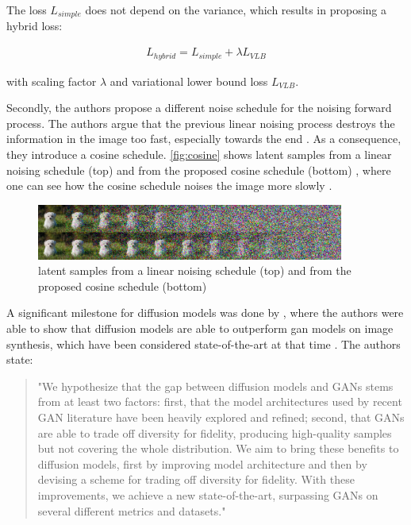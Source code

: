 The loss $L_{simple}$ does not depend on the variance, which results in \cite{nichol2021ImprovedDenoisingDiffusion} proposing a hybrid loss:

\begin{equation}
    \label{eqn:l_hybrid}
    \begin{align*}
        L_{hybrid} =L_{simple}+\lambda L_{VLB}
    \end{align*}
\end{equation}

with scaling factor $\lambda$ and variational lower bound loss $L_{VLB}$.

Secondly, the authors propose a different noise schedule for the noising forward process.
The authors argue that the previous linear noising process destroys the information in the image too fast, especially towards the end \cite{nichol2021ImprovedDenoisingDiffusion}.
As a consequence, they introduce a cosine schedule.
\autoref{fig:cosine} shows latent samples from a linear noising schedule (top) and from the proposed cosine schedule (bottom) \cite[Figure 3, p. 4]{nichol2021ImprovedDenoisingDiffusion}, where one can see how the cosine schedule noises the image more slowly \cite{nichol2021ImprovedDenoisingDiffusion}.

\begin{figure}[h]
    \centering
    \includegraphics[width=0.9\textwidth]{images/cosine.png}
    \caption[Noising Schedule]{latent samples from a linear noising schedule (top) and from the proposed cosine schedule (bottom) \cite[Figure 3, p. 4]{nichol2021ImprovedDenoisingDiffusion}}
    \label{fig:cosine}
\end{figure}

A significant milestone for diffusion models was done by \cite{dhariwal2021DiffusionModelsBeat}, where the authors were able to show that diffusion models are able to outperform \gls{gan}
models on image synthesis, which have been considered state-of-the-art at that time \cite{dhariwal2021DiffusionModelsBeat}.
The authors state:

\begin{quotation}
    "We hypothesize that the gap between diffusion models and GANs stems from at least two factors: 
    first, that the model architectures used by recent GAN literature have been heavily explored and refined; 
    second, that GANs are able to trade off diversity for fidelity, producing high-quality samples but not covering the whole distribution. 
    We aim to bring these benefits to diffusion models, first by improving model architecture and then by devising a scheme for trading off diversity for fidelity. 
    With these improvements, we achieve a new state-of-the-art, surpassing GANs on several different metrics and datasets." \cite[p. 2]{dhariwal2021DiffusionModelsBeat}
\end{quotation}


